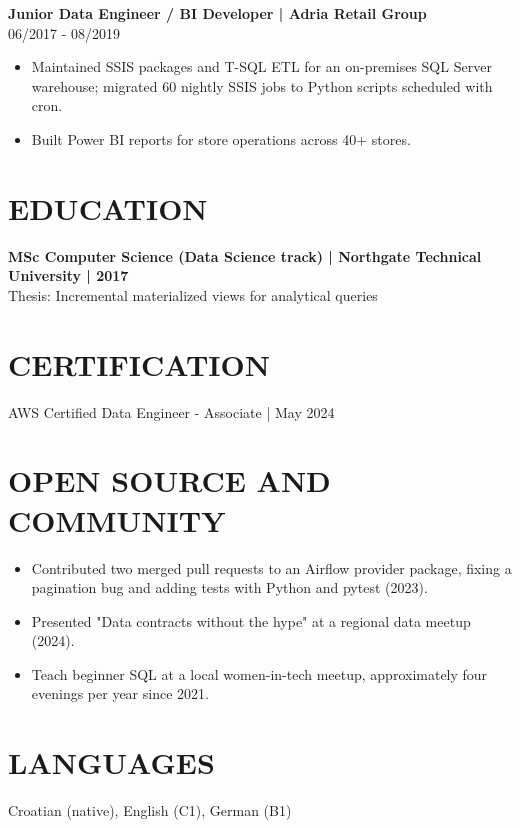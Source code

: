 \documentclass[11pt,a4paper]{article}
\newcommand{\cvsection}[1]{\section*{#1}}
\newcommand{\cvrole}[2]{\noindent\textbf{#1}\\#2\par}
\begin{document}
\cvrole{Junior Data Engineer / BI Developer | Adria Retail Group}{06/2017 - 08/2019}
\begin{itemize}
\item Maintained SSIS packages and T-SQL ETL for an on-premises SQL Server warehouse; migrated 60 nightly SSIS jobs to Python scripts scheduled with cron.
\item Built Power BI reports for store operations across 40+ stores.
\end{itemize}

\cvsection{EDUCATION}
\textbf{MSc Computer Science (Data Science track) | Northgate Technical University | 2017}\\
Thesis: Incremental materialized views for analytical queries

\cvsection{CERTIFICATION}
AWS Certified Data Engineer - Associate | May 2024

\cvsection{OPEN SOURCE AND COMMUNITY}
\begin{itemize}
\item Contributed two merged pull requests to an Airflow provider package, fixing a pagination bug and adding tests with Python and pytest (2023).
\item Presented "Data contracts without the hype" at a regional data meetup (2024).
\item Teach beginner SQL at a local women-in-tech meetup, approximately four evenings per year since 2021.
\end{itemize}

\cvsection{LANGUAGES}
Croatian (native), English (C1), German (B1)
\end{document}
